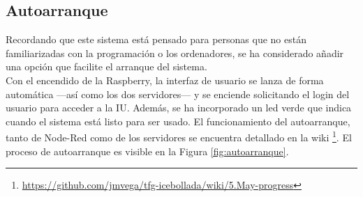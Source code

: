\subsection{Autoarranque}
Recordando que este sistema está pensado para personas que no están familiarizadas con la programación o los ordenadores, se ha considerado añadir una opción que facilite el arranque del sistema.\\

Con el encendido de la Raspberry, la interfaz de usuario se lanza de forma automática ---así como los dos servidores--- y se enciende solicitando el login del usuario para acceder a la IU. Además, se ha incorporado un led verde que indica cuando el sistema está listo para ser usado. El funcionamiento del autoarranque, tanto de Node-Red como de los servidores se encuentra detallado en la wiki \footnote{\url{https://github.com/jmvega/tfg-icebollada/wiki/5.May-progress}}. El proceso de autoarranque es visible en la Figura \ref{fig:autoarranque}.
